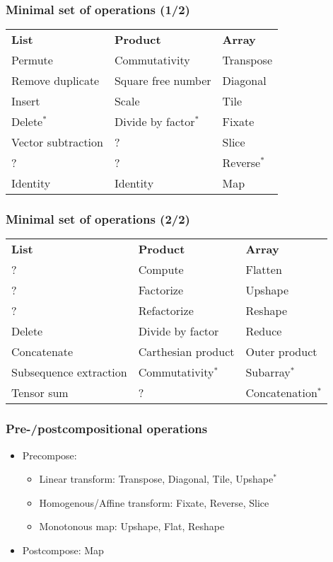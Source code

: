 \documentclass[xetex,mathserif,serif]{beamer}
\begin{document}
\begin{frame}
  \frametitle{Minimal set of operations (1/2)}
  
  \footnotesize
  \begin{center}
    \begin{tabular}{lll}
      \bfseries List & \bfseries Product & \bfseries Array  \\
      Permute & Commutativity  & Transpose  \\
      Remove duplicate & Square free number  & Diagonal  \\
      Insert & Scale  & Tile  \\
      Delete$^*$ & Divide by factor$^*$  & Fixate  \\
      Vector subtraction & ?  & Slice  \\
      ? & ? & Reverse$^*$  \\
      Identity & Identity & Map 
    \end{tabular}
  \end{center}
\end{frame}

\begin{frame}
  \frametitle{Minimal set of operations (2/2)}
  
  \footnotesize
  \begin{center}
    \begin{tabular}{lll}
      \bfseries List & \bfseries Product & \bfseries Array  \\
      ? & Compute & Flatten \\
      ? & Factorize & Upshape \\
      ? & Refactorize & Reshape \\
      Delete & Divide by factor & Reduce \\
      Concatenate & Carthesian product & Outer product \\
      Subsequence extraction & Commutativity$^*$ & Subarray$^*$ \\
      Tensor sum & ? & Concatenation$^*$
    \end{tabular}
  \end{center}
\end{frame}

\begin{frame}
  \frametitle{Pre-/postcompositional operations}
  
  \begin{itemize}
    \item Precompose:
    \begin{itemize}
      \item Linear transform: Transpose, Diagonal, Tile, Upshape$^*$
      \item Homogenous/Affine transform: Fixate, Reverse, Slice
      \item Monotonous map: Upshape, Flat, Reshape
    \end{itemize}
    \item Postcompose: Map
  \end{itemize}
\end{frame}
\end{document}
